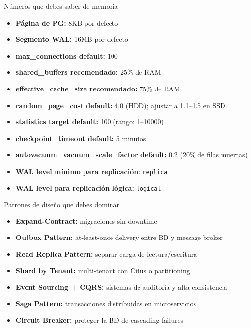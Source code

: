 \begin{teoriabox}{Números que debes saber de memoria}
\begin{itemize}
  \item \textbf{Página de PG:} 8KB por defecto
  \item \textbf{Segmento WAL:} 16MB por defecto
  \item \textbf{max\_connections default:} 100
  \item \textbf{shared\_buffers recomendado:} 25\% de RAM
  \item \textbf{effective\_cache\_size recomendado:} 75\% de RAM
  \item \textbf{random\_page\_cost default:} 4.0 (HDD); ajustar a 1.1--1.5 en SSD
  \item \textbf{statistics target default:} 100 (rango: 1--10000)
  \item \textbf{checkpoint\_timeout default:} 5 minutos
  \item \textbf{autovacuum\_vacuum\_scale\_factor default:} 0.2 (20\% de filas muertas)
  \item \textbf{WAL level mínimo para replicación:} \texttt{replica}
  \item \textbf{WAL level para replicación lógica:} \texttt{logical}
\end{itemize}
\end{teoriabox}

\begin{teoriabox}{Patrones de diseño que debes dominar}
\begin{itemize}
  \item \textbf{Expand-Contract:} migraciones sin downtime
  \item \textbf{Outbox Pattern:} at-least-once delivery entre BD y message broker
  \item \textbf{Read Replica Pattern:} separar carga de lectura/escritura
  \item \textbf{Shard by Tenant:} multi-tenant con Citus o partitioning
  \item \textbf{Event Sourcing + CQRS:} sistemas de auditoría y alta consistencia
  \item \textbf{Saga Pattern:} transacciones distribuidas en microservicios
  \item \textbf{Circuit Breaker:} proteger la BD de cascading failures
\end{itemize}
\end{teoriabox}
